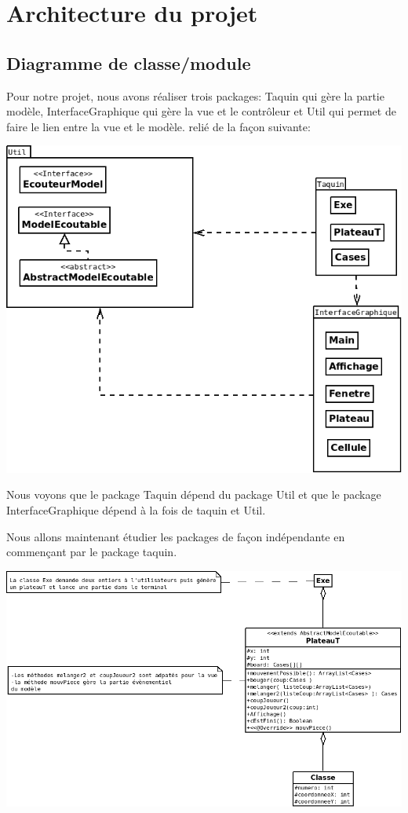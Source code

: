 \documentclass[12pt]{article}
\begin{document}
\vspace{10pt}

\section{Architecture du projet}

\subsection{Diagramme de classe/module}

Pour notre projet, nous avons réaliser trois packages: Taquin qui gère la partie modèle, InterfaceGraphique qui gère la vue et le contrôleur et Util qui permet de faire le lien entre la vue et le modèle. relié de la façon suivante:


\begin{center}
\includegraphics[scale=0.3]{images/ClasseGeneral.png}
\end{center}


Nous voyons que le package Taquin dépend du package Util et que le package InterfaceGraphique dépend à la fois de taquin et Util.

Nous allons maintenant étudier les packages de façon indépendante en commençant par le package taquin.


\begin{center}
\includegraphics[scale=0.3]{images/Taquin.png}
\end{center}
\end{document}
